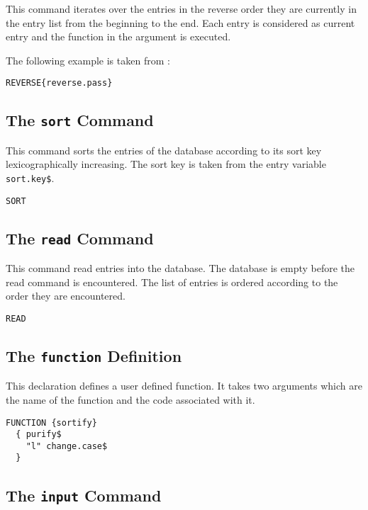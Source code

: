 This command iterates over the entries in the reverse order they are
currently in the entry list from the beginning to the end. Each entry
is considered as current entry and the function in the argument is
executed.

The following example is taken from :

\begin{lstlisting}[language=bst]
  REVERSE{reverse.pass}
\end{lstlisting}


\subsection{The \texttt{sort} Command}
%
\label{sec:sort}

This command sorts the entries of the database according to its sort
key lexicographically increasing. The sort key is taken from the entry
variable \texttt{sort.key\$}.

\begin{lstlisting}[language=bst]
  SORT
\end{lstlisting}


\subsection{The \texttt{read} Command}

This command read entries into the database. The database is empty
before the read command is encountered. The list of entries is ordered
according to the order they are encountered.

\begin{lstlisting}[language=bst]
  READ
\end{lstlisting}


\subsection{The \texttt{function} Definition}

This declaration defines a user defined function. It takes two
arguments which are the name of the function and the code associated
with it.

\begin{lstlisting}[language=bst]
  FUNCTION {sortify}
  { purify$
    "l" change.case$
  }
\end{lstlisting}


\subsection{The \texttt{input} Command}

